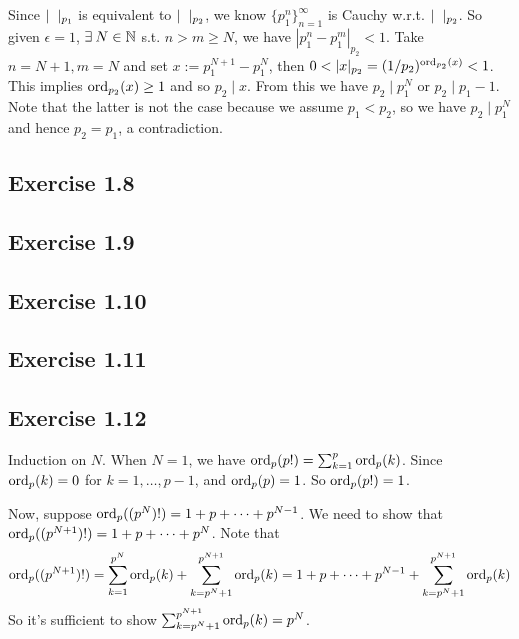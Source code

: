 \documentclass[../Koblitz.tex]{subfiles}
\begin{document}
Since $\snr_{p_1}$ is equivalent to $\snr_{p_2}$, we know $\{p_1^n\}_{n=1}^\infty$ is Cauchy w.r.t. $\snr_{p_2}$. So given $\epsilon=1$, $\exists N\in\NN$ s.t. $n>m\geq N$, we have $|p_1^n-p_1^m|_{p_2}<1$. Take $n=N+1,m=N$ and set $x:=p_1^{N+1}-p_1^N$, then $0<|x|_{p_2} = (1/p_2)^{\ord_{p_2}(x)} < 1$. This implies $\operatorname{ord}_{p_2}(x) \geq1$ and so $p_2\mid x$. From this we have $p_2\mid p_1^N$ or $p_2\mid p_1-1$. Note that the latter is not the case because we assume $p_1<p_2$, so we have $p_2\mid p_1^N$ and hence $p_2=p_1$, a contradiction.

\subsection*{Exercise 1.8}

\subsection*{Exercise 1.9}

\subsection*{Exercise 1.10}

\subsection*{Exercise 1.11}

\subsection*{Exercise 1.12}

Induction on $N$. When $N=1$, we have $\operatorname{ord}_p(p!)=\sum_{k=1}^p \operatorname{ord}_p(k)$. Since $\operatorname{ord}_p(k)=0$ for $k=1,\ldots,p-1$, and $\operatorname{ord}_p(p)=1$. So $\operatorname{ord}_p(p!)=1$.

Now, suppose $\operatorname{ord}_p((p^N)!)=1+p+\cdots+p^{N-1}$. We need to show that $\operatorname{ord}_p((p^{N+1})!) = 1+p+\cdots+p^N$. Note that $$\operatorname{ord}_p((p^{N+1})!) = \sum_{k=1}^{p^N} \operatorname{ord}_p(k) + \sum_{k=p^N+1}^{p^{N+1}} \operatorname{ord}_p (k) = 1+p+\cdots+p^{N-1} + \sum_{k=p^N+1}^{p^{N+1}} \operatorname{ord}_p (k)$$ So it's sufficient to show $\sum_{k=p^N+1}^{p^{N+1}} \operatorname{ord}_p (k) = p^N$.
\end{document}
